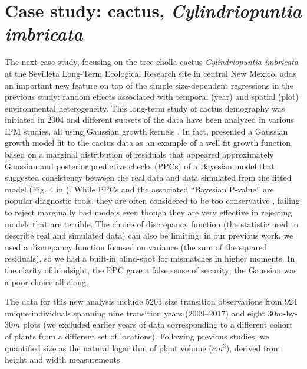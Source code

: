\documentclass[12pt]{article}
\begin{document}
\clearpage   

\section{Case study: cactus, \emph{Cylindriopuntia imbricata}}
The next case study, focusing on the tree cholla cactus \emph{Cylindriopuntia imbricata} at the Sevilleta Long-Term Ecological Research site in central New Mexico, adds an important new feature on top of the simple size-dependent regressions in the previous study: random effects associated with temporal (year) and spatial (plot) environmental heterogeneity. 
This long-term study of cactus demography was initiated in 2004 and different subsets of the data have been analyzed in various IPM studies, all using Gaussian growth kernels  \citep{miller2009impacts,czachurademographic,compagnoni2016effect,ohm2014balancing,elderd2016quantifying}.
In fact, \citep{elderd2016quantifying} presented a Gaussian growth model fit to the cactus data as an example of a well fit growth function, based on a marginal distribution of residuals that appeared approximately Gaussian and posterior predictive checks (PPCs) of a Bayesian model that suggested consistency between the real data and data simulated from the fitted model (Fig. 4 in \citep{elderd2016quantifying}). 
While PPCs and the associated ``Bayesian P-value'' are popular diagnostic tools, they are often considered to be too conservative \citep{conn2018guide,zhang2014comparative}, failing to reject marginally bad models even though they are very effective in rejecting models that are terrible.
The choice of discrepancy function (the statistic used to describe real and simulated data) can also be limiting: in our previous work, we used a discrepancy function focused on variance (the sum of the squared residuals), so we had a built-in blind-spot for mismatches in higher moments.
In the clarity of hindsight, the PPC gave a false sense of security; the Gaussian was a poor choice all along.

The data for this new analysis include $5203$ size transition observations from $924$ unique individuals spanning nine transition years (2009--2017) and eight $30m$-by-$30m$ plots (we excluded earlier years of data corresponding to a different cohort of plants from a different set of locations). 
Following previous studies, we quantified size as the natural logarithm of plant volume ($cm^3$), derived from height and width measurements. 
\end{document}
